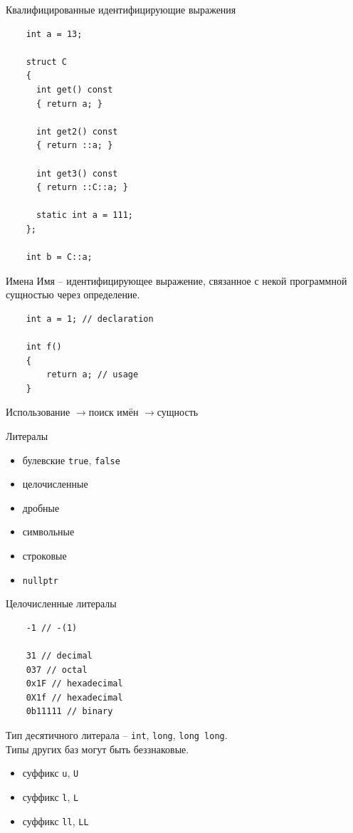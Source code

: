 \documentclass[unknownkeysallowed,xcolor=table]{beamer}
\newcommand{\rarr}{$\rightarrow$}
\begin{document}
\begin{frame}[fragile]{Квалифицированные идентифицирующие выражения}
  \begin{lstlisting}
    int a = 13;

    struct C
    {
      int get() const
      { return a; }

      int get2() const
      { return ::a; }

      int get3() const
      { return ::C::a; }

      static int a = 111;
    };

    int b = C::a;
  \end{lstlisting}
\end{frame}

\begin{frame}[fragile]{Имена}
  Имя -- идентифицирующее выражение, связанное с некой программной сущностью через определение. \vspace{2em}
  \begin{lstlisting}
    int a = 1; // declaration

    int f()
    {
        return a; // usage
    }
  \end{lstlisting}
  \vspace{2em}
  Использование \rarr поиск имён \rarr сущность
\end{frame}

\begin{frame}[fragile]{Литералы}
  \begin{itemize}
    \item булевские \lstinline{true}, \lstinline{false}
    \item целочисленные
    \item дробные
    \item символьные
    \item строковые
    \item \lstinline{nullptr}
  \end{itemize}
\end{frame}

\begin{frame}[fragile]{Целочисленные литералы}
  \begin{lstlisting}
    -1 // -(1)

    31 // decimal
    037 // octal
    0x1F // hexadecimal
    0X1f // hexadecimal
    0b11111 // binary
  \end{lstlisting}
  Тип десятичного литерала -- \lstinline{int}, \lstinline{long}, \lstinline{long long}. \\
  Типы других баз могут быть беззнаковые.
  \begin{itemize}
    \item суффикс \lstinline{u}, \lstinline{U}
    \item суффикс \lstinline{l}, \lstinline{L}
    \item суффикс \lstinline{ll}, \lstinline{LL}
  \end{itemize}
\end{frame}
\end{document}
